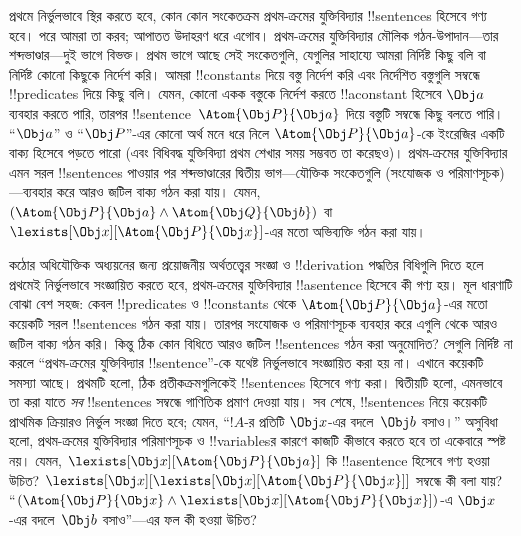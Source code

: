 \documentclass[../../../include/open-logic-section]{subfiles}
\begin{document}


প্রথমে নির্ভুলভাবে স্থির করতে হবে, কোন কোন সংকেতক্রম প্রথম-ক্রমের
যুক্তিবিদ্যার !!{sentence}s হিসেবে গণ্য হবে। পরে আমরা তা করব; আপাতত
উদাহরণ ধরে এগোব। প্রথম-ক্রমের যুক্তিবিদ্যার মৌলিক গঠন-উপাদান—তার
শব্দভাণ্ডার—দুই ভাগে বিভক্ত। প্রথম ভাগে আছে সেই সংকেতগুলি, যেগুলির
সাহায্যে আমরা নির্দিষ্ট কিছু বলি বা নির্দিষ্ট কোনো কিছুকে নির্দেশ করি।
আমরা !!{constant}s দিয়ে বস্তু নির্দেশ করি এবং নির্দেশিত বস্তুগুলি
সম্বন্ধে !!{predicate}s দিয়ে কিছু বলি। যেমন, কোনো একক বস্তুকে নির্দেশ
করতে !!a{constant} হিসেবে $\Obj a$ ব্যবহার করতে পারি, তারপর
!!{sentence}~$\Atom{\Obj P}{\Obj a}$ দিয়ে বস্তুটি সম্বন্ধে কিছু বলতে
পারি। “$\Obj a$” ও “$\Obj P$”-এর কোনো অর্থ মনে ধরে নিলে
$\Atom{\Obj P}{\Obj a}$-কে ইংরেজির একটি বাক্য হিসেবে পড়তে পারো (এবং
বিধিবদ্ধ যুক্তিবিদ্যা প্রথম শেখার সময় সম্ভবত তা করেছও)। প্রথম-ক্রমের
যুক্তিবিদ্যার এমন সরল !!{sentence}s পাওয়ার পর শব্দভাণ্ডারের দ্বিতীয়
ভাগ—যৌক্তিক সংকেতগুলি (সংযোজক ও পরিমাণসূচক)—ব্যবহার করে আরও জটিল বাক্য
গঠন করা যায়। যেমন, $(\Atom{\Obj P}{\Obj a} \land \Atom{\Obj Q}{\Obj b})$
বা~$\lexists[\Obj x][\Atom{\Obj P}{\Obj x}]$-এর মতো অভিব্যক্তি গঠন করা
যায়।

কঠোর অধিযৌক্তিক অধ্যয়নের জন্য প্রয়োজনীয় অর্থতত্ত্বের সংজ্ঞা ও
!!{derivation} পদ্ধতির বিধিগুলি দিতে হলে প্রথমেই নির্ভুলভাবে সংজ্ঞায়িত
করতে হবে, প্রথম-ক্রমের যুক্তিবিদ্যার !!a{sentence} হিসেবে কী গণ্য হয়।
মূল ধারণাটি বোঝা বেশ সহজ: কেবল !!{predicate}s ও !!{constant}s থেকে
$\Atom{\Obj P}{\Obj a}$-এর মতো কয়েকটি সরল !!{sentence}s গঠন করা যায়।
তারপর সংযোজক ও পরিমাণসূচক ব্যবহার করে এগুলি থেকে আরও জটিল বাক্য গঠন করি।
কিন্তু ঠিক কোন বিধিতে আরও জটিল !!{sentence}s গঠন করা অনুমোদিত? সেগুলি
নির্দিষ্ট না করলে “প্রথম-ক্রমের যুক্তিবিদ্যার !!{sentence}”-কে যথেষ্ট
নির্ভুলভাবে সংজ্ঞায়িত করা হয় না। এখানে কয়েকটি সমস্যা আছে। প্রথমটি
হলো, ঠিক প্রতীকক্রমগুলিকেই !!{sentence}s হিসেবে গণ্য করা। দ্বিতীয়টি
হলো, এমনভাবে তা করা যাতে \emph{সব} !!{sentence}s সম্বন্ধে গাণিতিক প্রমাণ
দেওয়া যায়। সব শেষে, !!{sentence}s নিয়ে কয়েকটি প্রাথমিক ক্রিয়ারও
নির্ভুল সংজ্ঞা দিতে হবে; যেমন, “$!A$-র প্রতিটি $\Obj x$-এর বদলে~$\Obj b$
বসাও।” অসুবিধা হলো, প্রথম-ক্রমের যুক্তিবিদ্যার পরিমাণসূচক ও !!{variable}sর
কারণে কাজটি কীভাবে করতে হবে তা একেবারে স্পষ্ট নয়। যেমন,
$\lexists[\Obj x][\Atom{\Obj P}{\Obj a}]$ কি !!a{sentence} হিসেবে গণ্য
হওয়া উচিত? $\lexists[\Obj x][\lexists[\Obj x][\Atom{\Obj P}{\Obj x}]]$
সম্বন্ধে কী বলা যায়? “$(\Atom{\Obj P}{\Obj x} \land \lexists[\Obj
x][\Atom{\Obj P}{\Obj x}])$-এ $\Obj x$-এর বদলে~$\Obj b$ বসাও”—এর ফল
কী হওয়া উচিত?
\end{document}
